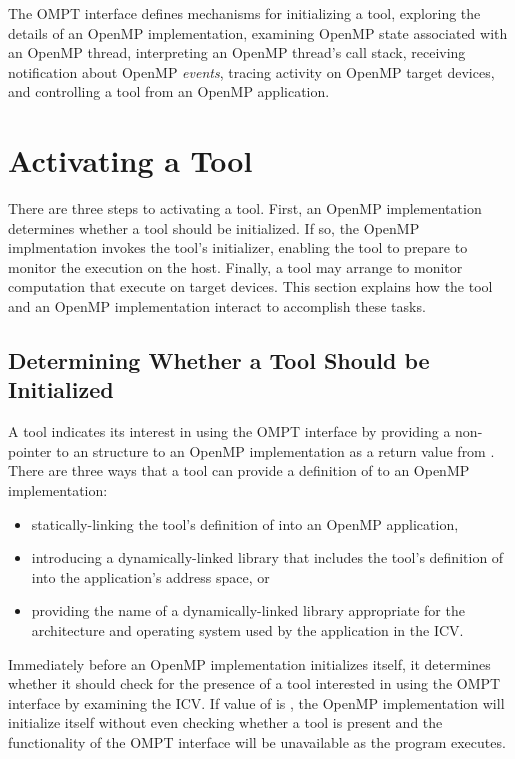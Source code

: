 The OMPT interface defines mechanisms for initializing a tool,
exploring the details of an OpenMP implementation, examining OpenMP state
associated with an OpenMP thread, interpreting an OpenMP thread's call stack,
receiving notification about OpenMP \emph{events}, tracing activity on 
OpenMP target devices, and controlling a tool from an OpenMP application.

\section{Activating a Tool}
\label{sec:ompt-initialization}

There are three steps to activating a tool. First, an OpenMP
implementation determines whether a tool should be initialized.  If
so, the OpenMP implmentation invokes the tool's initializer, enabling
the tool to prepare to monitor the execution on the host. Finally, a
tool may arrange to monitor computation that execute 
on target devices. This section explains how the tool and an 
OpenMP implementation interact to accomplish these tasks.

\subsection{Determining Whether a Tool Should be Initialized}
\label{sec:ompt-check-tool}

A tool indicates its interest in using the OMPT interface 
by providing a non- pointer to an 
structure to an OpenMP implementation as a return value from 
. There are three ways
that a tool can provide a definition of  to an
OpenMP implementation:

\begin{itemize}
\item statically-linking the tool's definition of 
  into an OpenMP application, 
\item introducing a dynamically-linked library that includes the tool's definition
  of  into the application's address space, or 
\item providing the name of a dynamically-linked library appropriate
  for the architecture and operating system used by the application
  in the  ICV.
\end{itemize}

Immediately before an OpenMP implementation initializes itself, it
determines whether it should check for the presence of a tool
interested in using the OMPT interface by examining the 
ICV.  If value of  is , the OpenMP
implementation will initialize itself without even checking whether a
tool is present and the functionality of the OMPT interface will be
unavailable as the program executes.
 

